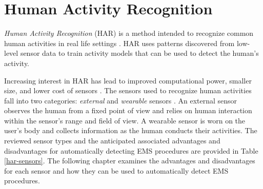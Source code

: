\section{Human Activity Recognition}
\label{sec:Literature-Review:Human-Activity-Recognition}
\emph{Human Activity Recognition} (\gls{HAR}) is a method intended to recognize common human activities in real life settings \cite{Helal2010}. HAR uses patterns discovered from low-level sensor data to train activity models that can be used to detect the human's activity.
\par Increasing interest in HAR has lead to improved computational power, smaller size, and lower cost of sensors \cite{Rodgers2015}. The sensors used to recognize human activities fall into two categories: \emph{external} and \emph{wearable} sensors \cite{Lara2013}. An external sensor observes the human from a fixed point of view and relies on human interaction within the sensor's range and field of view. A wearable sensor is worn on the user's body and collects information as the human conducts their activities. The reviewed sensor types and the anticipated associated advantages and disadvantages for automatically detecting EMS procedures are provided in Table \ref{har-sensors}. The following chapter examines the advantages and disadvantages for each sensor and how they can be used to automatically detect EMS procedures.

